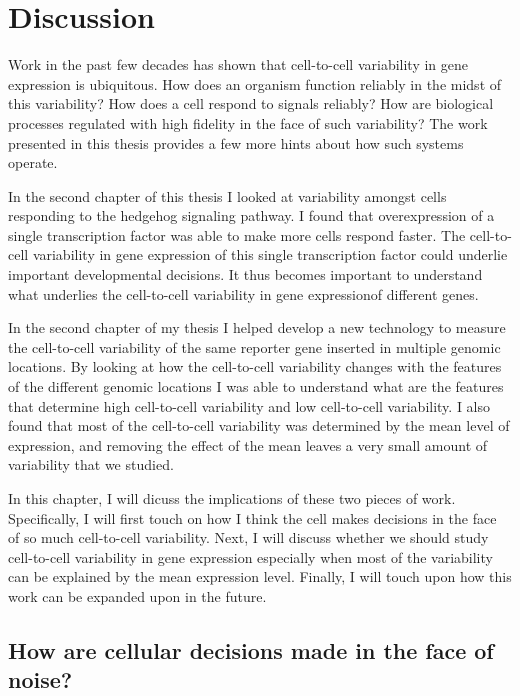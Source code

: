 \chapter{Discussion}
\label{chap:conclusion}
\tightlists

Work in the past few decades has shown that cell-to-cell variability in gene expression is ubiquitous. How does an organism function reliably in the midst of this variability? How does a cell respond to signals reliably? How are biological processes regulated with high fidelity in the face of such variability? The work presented in this thesis provides a few more hints about how such systems operate.

In the second chapter of this thesis I looked at variability amongst cells responding to the hedgehog signaling pathway. I found that overexpression of a single transcription factor was able to make more cells respond faster. The cell-to-cell variability in gene expression of this single transcription factor could underlie important developmental decisions. It thus becomes important to understand what underlies the cell-to-cell variability in gene expressionof different genes.

In the second chapter of my thesis I helped develop a new technology to measure the cell-to-cell variability of the same reporter gene inserted in multiple genomic locations. By looking at how the cell-to-cell variability changes with the features of the different genomic locations I was able to understand what are the features that determine high cell-to-cell variability and low cell-to-cell variability. I also found that most of the cell-to-cell variability was determined by the mean level of expression, and removing the effect of the mean leaves a very small amount of variability that we studied.

In this chapter, I will dicuss the implications of these two pieces of work. Specifically, I will first touch on how I think the cell makes decisions in the face of so much cell-to-cell variability. Next, I will discuss whether we should study cell-to-cell variability in gene expression especially when most of the variability can be explained by the mean expression level. Finally, I will touch upon how this work can be expanded upon in the future.

\section{How are cellular decisions made in the face of noise?}

